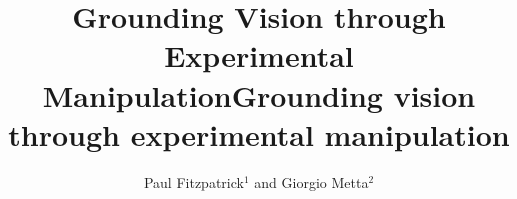 \documentclass[]{rspublic}
\begin{document}
 

\onecolumn





\title{Grounding Vision through Experimental Manipulation}



\title[Grounding vision]{Grounding vision through experimental manipulation}

\author[P. Fitzpatrick, G. Metta]{Paul Fitzpatrick$^1$ and Giorgio Metta$^2$}


\label{firstpage}

\maketitle

































\end{document}
